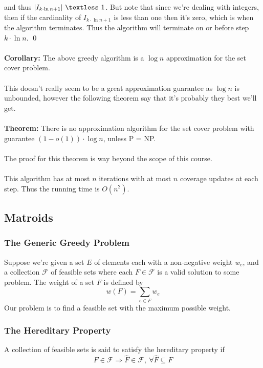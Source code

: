 \documentclass{article}
\newcommand{\lt}{\textless}
\newcommand{\imply}{\Rightarrow}
\newcommand{\x}{\cdot}
\newcommand{\thm}{\textbf{Theorem: }}
\newcommand{\cor}{\textbf{Corollary: }}
\newcommand{\mcal}[1]{\mathcal{#1}}
\begin{document}
and thus $|I_{k\x \ln n +1}|\ \lt\ 1$. But note that since we're dealing with integers, then if the cardinality of $I_{k\x \ln n +1}$ is less than one then it's zero, which is when the algorithm terminates. Thus the algorithm will terminate on or before step $k\x \ln n$.
\qed\\\\
\cor The above greedy algorithm is a $\log n$ approximation for the set cover problem.\\\\
This doesn't really seem to be a great approximation guarantee as $\log n$ is unbounded, however the following theorem say that it's probably they best we'll get.\\\\
\thm There is no approximation algorithm for the set cover problem with guarantee $(1 - o(1))\x \log n$, unless P = NP.\\\\
The proof for this theorem is way beyond the scope of this course.\\\\
This algorithm has at most $n$ iterations with at most $n$ coverage updates at each step. Thus the running time is $O(n^2)$.
\subsection{Matroids}
\subsubsection{The Generic Greedy Problem}
Suppose we're given a set $E$ of elements each with a non-negative weight $w_e$, and a collection $\mcal{F}$ of feasible sets where each $F \in \mcal{F}$ is a valid solution to some problem. The weight of a set $F$ is defined by
\[w(F) = \sum_{e \in F} w_e\]
Our problem is to find a feasible set with the maximum possible weight.
\subsubsection{The Hereditary Property}
A collection of feasible sets is said to satisfy the hereditary property if
\[F \in \mcal{F} \imply \hat{F} \in \mcal{F},\ \forall \hat{F} \subseteq F\]
\end{document}
